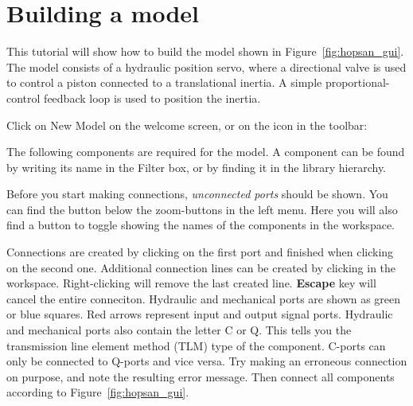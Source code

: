 \documentclass[a4paper,pdftex]{article}
\begin{document}
\section*{Building a model}
This tutorial will show how to build the model shown in Figure~\ref{fig:hopsan_gui}.
The model consists of a hydraulic position servo, where a directional valve is used to control a piston connected to a translational inertia.
A simple proportional-control feedback loop is used to position the inertia.
\begin{tutenumerate}
Click on New Model on the welcome screen, or on the icon in the toolbar:
 	
 	
The following components are required for the model.
A component can be found by writing its name in the Filter box, or by finding it in the library hierarchy.

\vspace{5pt}
\vspace{5pt}

Before you start making connections, \emph{unconnected ports} should be shown. 
You can find the button below the zoom-buttons in the left menu. 
Here you will also find a button to toggle showing the names of the components in the workspace.


Connections are created by clicking on the first port and finished when clicking on the second one.
Additional connection lines can be created by clicking in the workspace.
Right-clicking will remove the last created line.
\textbf{Escape} key will cancel the entire conneciton.
Hydraulic and mechanical ports are shown as green or blue squares.
Red arrows represent input and output signal ports.
Hydraulic and mechanical ports also contain the letter C or Q.
This tells you the transmission line element method (TLM) type of the component.
C-ports can only be connected to Q-ports and vice versa.
Try making an erroneous connection on purpose, and note the resulting error message.
Then connect all components according to Figure~\ref{fig:hopsan_gui}.


\end{tutenumerate}
\end{document}
